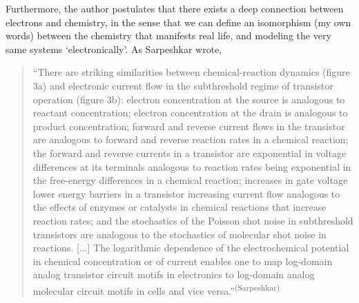 Furthermore, the author postulates that there exists a deep connection between electrons and chemistry, in the sense that we can define an isomorphism (my own words) between the chemistry that manifests real life, and modeling the very same systems `electronically'.  As Sarpeshkar wrote,
\begin{quotation}
    ``There are striking similarities between chemical-reaction dynamics (figure 3a) and electronic current flow in the subthreshold regime of transistor operation (figure 3b): electron concentration at the source is analogous to reactant concentration; electron concentration at the drain is analogous to product concentration; forward and reverse current flows in the transistor are analogous to forward and reverse reaction rates in a chemical reaction; the forward and reverse currents in a transistor are exponential in voltage differences at its terminals analogous to reaction rates being exponential in the free-energy differences in a chemical reaction; increases in gate voltage lower energy barriers in a transistor increasing current flow analogous to the effects of enzymes or catalysts in chemical reactions that increase reaction rates; and the stochastics of the Poisson shot noise in subthreshold transistors are analogous to the stochastics of molecular shot noise in reactions. [...] The logarithmic dependence of the electrochemical potential in chemical concentration or of current enables one to map log-domain analog transistor circuit motifs in electronics to log-domain analog molecular circuit motifs in cells and vice versa.''\textsuperscript{(Sarpeshkar)}
\end{quotation}





